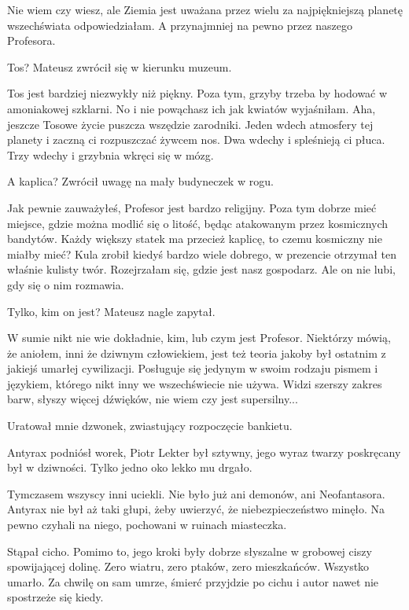\ds{} Nie wiem czy wiesz, ale Ziemia jest uważana przez wielu za najpiękniejszą planetę wszechświata \dm{} odpowiedziałam. \dm{}
A przynajmniej na pewno przez naszego Profesora. \de{}

\ds{} Tos? \dm{} Mateusz zwrócił się w kierunku muzeum. \de{}

\ds{} Tos jest bardziej niezwykły niż piękny. Poza tym, grzyby trzeba by hodować w amoniakowej szklarni.
No i nie powąchasz ich jak kwiatów \ds{} wyjaśniłam. \dm{} Aha, jeszcze Tosowe życie puszcza wszędzie zarodniki. 
Jeden wdech atmosfery tej planety i zaczną ci rozpuszczać żywcem nos. Dwa wdechy i spleśnieją ci płuca. Trzy wdechy i grzybnia wkręci się w mózg. \de{}

\ds{} A kaplica? \dm{} Zwrócił uwagę na mały budyneczek w rogu. \de{}

\ds{} Jak pewnie zauważyłeś, Profesor jest bardzo religijny. Poza tym dobrze mieć miejsce, gdzie można modlić się o litość, będąc atakowanym przez kosmicznych bandytów. 
Każdy większy statek ma przecież kaplicę, to czemu kosmiczny nie miałby mieć? Kula zrobił kiedyś bardzo wiele dobrego, w prezencie otrzymał ten właśnie kulisty twór. \dm{}
Rozejrzałam się, gdzie jest nasz gospodarz. \dm{}
Ale on nie lubi, gdy się o nim rozmawia. \de{}

\ds{} Tylko, kim on jest? \dm{} Mateusz nagle zapytał. \de{}

\ds{} W sumie nikt nie wie dokładnie, kim, lub czym jest Profesor. Niektórzy mówią, że aniołem, inni że dziwnym człowiekiem,
jest też teoria jakoby był ostatnim z jakiejś umarłej cywilizacji. 
Posługuje się jedynym w swoim rodzaju pismem i językiem, którego nikt inny we wszechświecie nie używa.
Widzi szerszy zakres barw, słyszy więcej dźwięków, nie wiem czy jest supersilny... \de{}

Uratował mnie dzwonek, zwiastujący rozpoczęcie bankietu.

\divider{}

Antyrax podniósł worek, Piotr Lekter był sztywny, jego wyraz twarzy poskręcany był w dziwności. Tylko jedno oko lekko mu drgało.

Tymczasem wszyscy inni uciekli. Nie było już ani demonów, ani Neofantasora. Antyrax nie był aż taki głupi, żeby uwierzyć, że niebezpieczeństwo minęło. 
Na pewno czyhali na niego, pochowani w ruinach miasteczka.

Stąpał cicho. Pomimo to, jego kroki były dobrze słyszalne w grobowej ciszy spowijającej dolinę.
Zero wiatru, zero ptaków, zero mieszkańców. Wszystko umarło.
Za chwilę on sam umrze, śmierć przyjdzie po cichu i autor nawet nie spostrzeże się kiedy.

